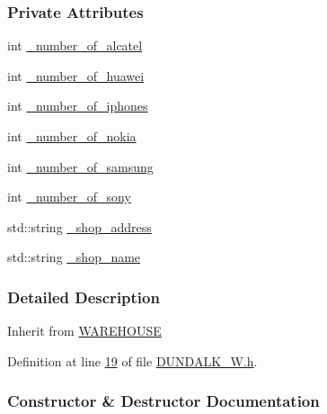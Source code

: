 \subsubsection*{Private Attributes}
\begin{DoxyCompactItemize}
\item 
int \hyperlink{class_d_u_n_d_a_l_k___w_a67a471ec2d409a309ebc179ff4d789bc_a67a471ec2d409a309ebc179ff4d789bc}{\+\_\+number\+\_\+of\+\_\+alcatel}
\item 
int \hyperlink{class_d_u_n_d_a_l_k___w_a84781068676dee44cb4654706d8fec51_a84781068676dee44cb4654706d8fec51}{\+\_\+number\+\_\+of\+\_\+huawei}
\item 
int \hyperlink{class_d_u_n_d_a_l_k___w_a82b528f661644166d93a5209524b4543_a82b528f661644166d93a5209524b4543}{\+\_\+number\+\_\+of\+\_\+iphones}
\item 
int \hyperlink{class_d_u_n_d_a_l_k___w_a8e794ecf0c55b5606a8f4a0ab214c657_a8e794ecf0c55b5606a8f4a0ab214c657}{\+\_\+number\+\_\+of\+\_\+nokia}
\item 
int \hyperlink{class_d_u_n_d_a_l_k___w_afec98ddc022c03aaaaa2848e5ca7cfb3_afec98ddc022c03aaaaa2848e5ca7cfb3}{\+\_\+number\+\_\+of\+\_\+samsung}
\item 
int \hyperlink{class_d_u_n_d_a_l_k___w_a9a40b513a6d4153a9a0f37ce47429369_a9a40b513a6d4153a9a0f37ce47429369}{\+\_\+number\+\_\+of\+\_\+sony}
\item 
std\+::string \hyperlink{class_d_u_n_d_a_l_k___w_a84ef96f22ec520afc66bb26b0d264475_a84ef96f22ec520afc66bb26b0d264475}{\+\_\+shop\+\_\+address}
\item 
std\+::string \hyperlink{class_d_u_n_d_a_l_k___w_ac9018980d31ba581cd83b07df0b171e2_ac9018980d31ba581cd83b07df0b171e2}{\+\_\+shop\+\_\+name}
\end{DoxyCompactItemize}


\subsubsection{Detailed Description}
Inherit from \hyperlink{class_w_a_r_e_h_o_u_s_e}{W\+A\+R\+E\+H\+O\+U\+SE} 

Definition at line \hyperlink{_d_u_n_d_a_l_k___w_8h_source_l00019}{19} of file \hyperlink{_d_u_n_d_a_l_k___w_8h_source}{D\+U\+N\+D\+A\+L\+K\+\_\+\+W.\+h}.



\subsubsection{Constructor \& Destructor Documentation}
